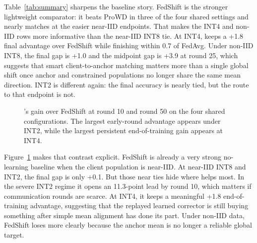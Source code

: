 Table~\ref{tab:summary} sharpens the baseline story. FedShift is the stronger
lightweight comparator: it beats ProWD in three of the four shared settings and
nearly matches \method at the easier near-IID endpoints. That makes the INT4
and non-IID rows more informative than the near-IID INT8 tie. At INT4,
\method keeps a +1.8 final advantage over FedShift while finishing within 0.7
of FedAvg. Under non-IID INT8, the final gap is +1.0 and the midpoint gap is
+3.9 at round 25, which suggests that smart client-to-anchor matching matters
more than a single global shift once anchor and constrained populations no
longer share the same mean direction. INT2 is different again: the final
accuracy is nearly tied, but the route to that endpoint is not.

\begin{figure}[t]
  \centering
  \resizebox{0.98\columnwidth}{!}{}
  \caption{\method's gain over FedShift at round 10 and round 50 on the four
  shared configurations. The largest early-round advantage appears under INT2,
  while the largest persistent end-of-training gain appears at INT4.}
  \label{fig:fedshift_gains}
\end{figure}

Figure~\ref{fig:fedshift_gains} makes that contrast explicit. FedShift is
already a very strong no-learning baseline when the client population is
near-IID. At near-IID INT8 and INT2, the final gap is only +0.1. But those
near ties hide where \method helps most. In the severe INT2 regime it opens an
11.3-point lead by round 10, which matters if communication rounds are scarce.
At INT4, it keeps a meaningful +1.8 end-of-training advantage, suggesting that
the replayed learned corrector is still buying something after simple mean
alignment has done its part. Under non-IID data, FedShift loses more clearly
because the anchor mean is no longer a reliable global target.

